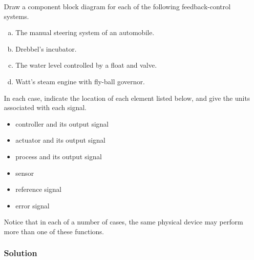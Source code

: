 Draw a component block diagram for each of the following feedback-control
systems.
\begin{enumerate}[(a)] \itemsep1pt \parskip0pt 
   \item The manual steering system of an automobile.
   \item Drebbel's incubator.
   \item The water level controlled by a float and valve.
   \item Watt's steam engine with fly-ball governor.
\end{enumerate}
In each case, indicate the location of each element listed below, and give the
units associated with each signal.
\begin{itemize} \itemsep1pt \parskip0pt 
   \item controller and its output signal
   \item actuator and its output signal
   \item process and its output signal
   \item sensor
   \item reference signal
   \item error signal
\end{itemize}
Notice that in each of a number of cases, the same physical device may perform
more than one of these functions.

\subsubsection{Solution}

